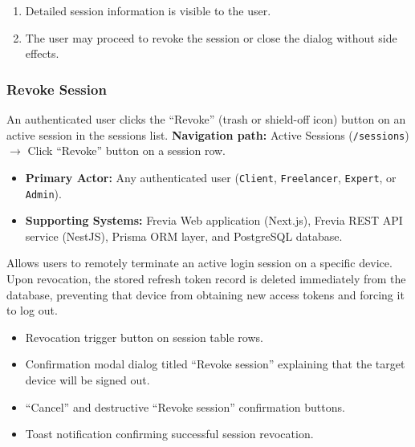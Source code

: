 \begin{enumerate}[leftmargin=1.6em,topsep=3pt,itemsep=2pt,parsep=0pt]
    \item Detailed session information is visible to the user.
    \item The user may proceed to revoke the session or close the dialog without side effects.
\end{enumerate}

\subsubsection{ Revoke Session}

An authenticated user clicks the ``Revoke'' (trash or shield-off icon) button on an active session in the sessions list.\newline
\textbf{Navigation path:} Active Sessions (\texttt{/sessions}) $\rightarrow$ Click ``Revoke'' button on a session row.


\begin{itemize}[leftmargin=1.6em,topsep=3pt,itemsep=2pt,parsep=0pt,label=$\bullet$]
    \item \textbf{Primary Actor:} Any authenticated user (\texttt{Client}, \texttt{Freelancer}, \texttt{Expert}, or \texttt{Admin}).
    \item \textbf{Supporting Systems:} Frevia Web application (Next.js), Frevia REST API service (NestJS), Prisma ORM layer, and PostgreSQL database.
\end{itemize}

\noindent Allows users to remotely terminate an active login session on a specific device. Upon revocation, the stored refresh token record is deleted immediately from the database, preventing that device from obtaining new access tokens and forcing it to log out.

\begin{itemize}[leftmargin=1.6em,topsep=3pt,itemsep=2pt,parsep=0pt,label=$\bullet$]
    \item Revocation trigger button on session table rows.
    \item Confirmation modal dialog titled ``Revoke session'' explaining that the target device will be signed out.
    \item ``Cancel'' and destructive ``Revoke session'' confirmation buttons.
    \item Toast notification confirming successful session revocation.
\end{itemize}

